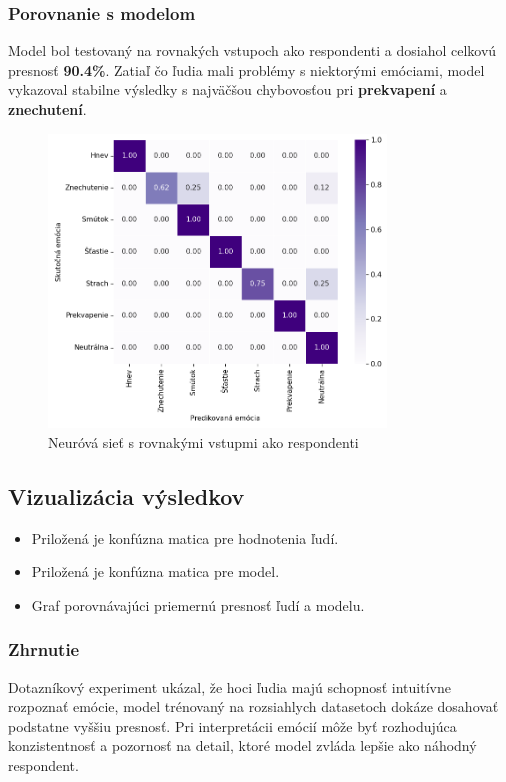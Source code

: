 \subsubsection{Porovnanie s modelom}
Model bol testovan\'y na rovnak\'ych vstupoch ako respondenti a dosiahol celkov\'u presnos\v{t} \textbf{90.4\%}. Zatia\v{l} \v{c}o \v{l}udia mali probl\'emy s niektor\'ymi em\'ociami, model vykazoval stabilne v\'ysledky s najv\"a\v{c}\v{s}ou chybovos\v{t}ou pri \textbf{prekvapen\'i} a \textbf{znechuten\'i}.
\begin{figure}[!htpb]
    \centering
    \includegraphics[width=0.8\textwidth]{img/experiments/confusion_nn_google_data.png}
    \caption{Neur\'ov\'a sie\v{t} s rovnak\'ymi vstupmi ako respondenti}
    \label{fig:nn_google_data}
\end{figure}
\subsection{Vizualiz\'acia v\'ysledkov}
\begin{itemize}
    \item Prilo\v{z}en\'a je konf\'uzna matica pre hodnotenia \v{l}ud\'i.
    \item Prilo\v{z}en\'a je konf\'uzna matica pre model.
    \item Graf porovn\'avaj\'uci priemern\'u presnos\v{t} \v{l}ud\'i a modelu.
\end{itemize}

\subsubsection{Zhrnutie}
Dotazn\'ikov\'y experiment uk\'azal, \v{z}e hoci \v{l}udia maj\'u schopnos\v{t} intuit\'ivne rozpozna\v{t} em\'ocie, model tr\'enovan\'y na rozsiahlych datasetoch dok\'aze dosahova\v{t} podstatne vy\v{s}\v{s}iu presnos\v{t}. Pri interpret\'acii em\'oci\'i m\^o\v{z}e by\v{t} rozhoduj\'uca konzistentnos\v{t} a pozornos\v{t} na detail, ktor\'e model zvl\'ada lep\v{s}ie ako n\'ahodn\'y respondent.

